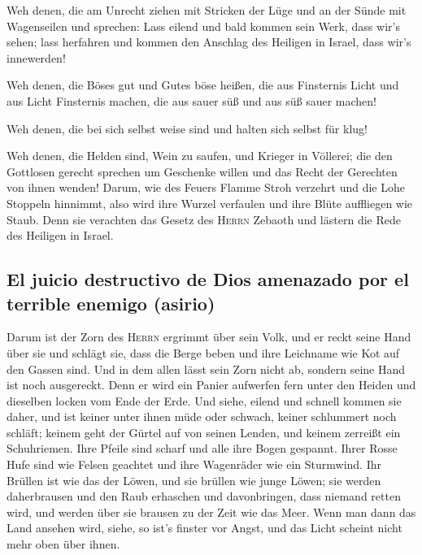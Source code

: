  Weh denen, die am Unrecht ziehen mit Stricken der Lüge
und an der Sünde mit Wagenseilen  und sprechen: Lass
eilend und bald kommen sein Werk, dass wir's sehen; lass herfahren und
kommen den Anschlag des Heiligen in Israel, dass wir's innewerden!

 Weh denen, die Böses gut und Gutes böse heißen, die aus
Finsternis Licht und aus Licht Finsternis machen, die aus sauer süß und
aus süß sauer machen!

 Weh denen, die bei sich selbst weise sind und halten
sich selbst für klug!

 Weh denen, die Helden sind, Wein zu saufen, und Krieger
in Völlerei;  die den Gottlosen gerecht sprechen um
Geschenke willen und das Recht der Gerechten von ihnen wenden!
 Darum, wie des Feuers Flamme Stroh verzehrt und die Lohe
Stoppeln hinnimmt, also wird ihre Wurzel verfaulen und ihre Blüte
auffliegen wie Staub. Denn sie verachten das Gesetz des \textsc{Herrn}
Zebaoth und lästern die Rede des Heiligen in Israel.

\hypertarget{el-juicio-destructivo-de-dios-amenazado-por-el-terrible-enemigo-asirio}{%
\subsection{El juicio destructivo de Dios amenazado por el terrible
enemigo
(asirio)}\label{el-juicio-destructivo-de-dios-amenazado-por-el-terrible-enemigo-asirio}}

 Darum ist der Zorn des \textsc{Herrn} ergrimmt über sein
Volk, und er reckt seine Hand über sie und schlägt sie, dass die Berge
beben und ihre Leichname wie Kot auf den Gassen sind. Und in dem allen
lässt sein Zorn nicht ab, sondern seine Hand ist noch ausgereckt.
 Denn er wird ein Panier aufwerfen fern unter den Heiden
und dieselben locken vom Ende der Erde. Und siehe, eilend und schnell
kommen sie daher,  und ist keiner unter ihnen müde oder
schwach, keiner schlummert noch schläft; keinem geht der Gürtel auf von
seinen Lenden, und keinem zerreißt ein Schuhriemen.  Ihre
Pfeile sind scharf und alle ihre Bogen gespannt. Ihrer Rosse Hufe sind
wie Felsen geachtet und ihre Wagenräder wie ein Sturmwind.
 Ihr Brüllen ist wie das der Löwen, und sie brüllen wie
junge Löwen; sie werden daherbrausen und den Raub erhaschen und
davonbringen, dass niemand retten wird,  und werden über
sie brausen zu der Zeit wie das Meer. Wenn man dann das Land ansehen
wird, siehe, so ist's finster vor Angst, und das Licht scheint nicht
mehr oben über ihnen.

